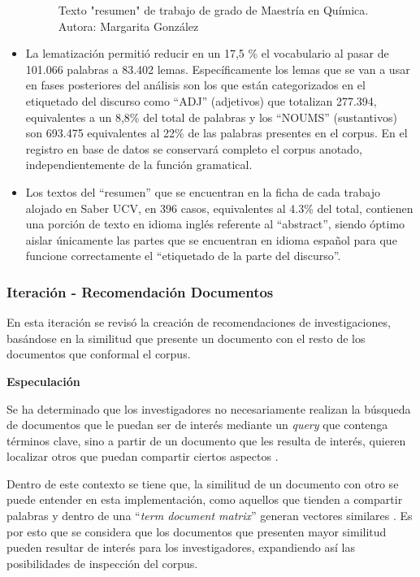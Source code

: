 \documentclass[
  12pt,
  openany]{book}
\begin{document}
\begin{itemize}
\begin{figure}
  \caption{Texto "resumen" de trabajo de grado de Maestría en Química. Autora: Margarita González}\label{fig:quimica}
  \end{figure}
\item
  La lematización permitió reducir en un 17,5 \% el vocabulario al pasar de 101.066 palabras a 83.402 lemas. Específicamente los lemas que se van a usar en fases posteriores del análisis son los que están categorizados en el etiquetado del discurso como ``ADJ'' (adjetivos) que totalizan 277.394, equivalentes a un 8,8\% del total de palabras y los ``NOUMS'' (sustantivos) son 693.475 equivalentes al 22\% de las palabras presentes en el corpus. En el registro en base de datos se conservará completo el corpus anotado, independientemente de la función gramatical.
\item
  Los textos del ``resumen'' que se encuentran en la ficha de cada trabajo alojado en Saber UCV, en 396 casos, equivalentes al 4.3\% del total, contienen una porción de texto en idioma inglés referente al ``abstract'', siendo óptimo aislar únicamente las partes que se encuentran en idioma español para que funcione correctamente el ``etiquetado de la parte del discurso''.
\end{itemize}

\hypertarget{imrecomendacion}{%
\subsubsection{Iteración - Recomendación Documentos}\label{imrecomendacion}}

En esta iteración se revisó la creación de recomendaciones de investigaciones, basándose en la similitud que presente un documento con el resto de los documentos que conformal el corpus.

\textbf{Especulación}

Se ha determinado que los investigadores no necesariamente realizan la búsqueda de documentos que le puedan ser de interés mediante un \emph{query} que contenga términos clave, sino a partir de un documento que les resulta de interés, quieren localizar otros que puedan compartir ciertos aspectos \citep{zhou2018}.

Dentro de este contexto se tiene que, la similitud de un documento con otro se puede entender en esta implementación, como aquellos que tienden a compartir palabras y dentro de una ``\emph{term document matrix}'' generan vectores similares \citep{jurafsky2009}. Es por esto que se considera que los documentos que presenten mayor similitud pueden resultar de interés para los investigadores, expandiendo así las posibilidades de inspección del corpus.
\end{document}
